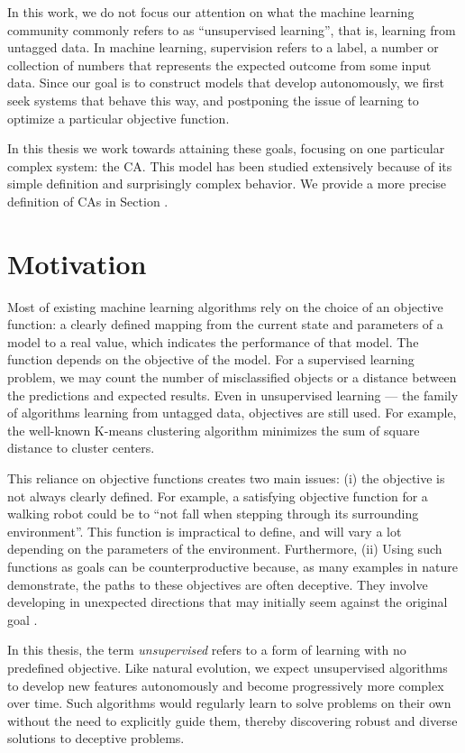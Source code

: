 In this work, we do not focus our attention on what the machine learning
community commonly refers to as ``unsupervised learning'', that is, learning
from untagged data. In machine learning, supervision refers to a label, a number
or collection of numbers that represents the expected outcome from some input
data. Since our goal is to construct models that develop autonomously, we first
seek systems that behave this way, and postponing the issue of learning to
optimize a particular objective function.

In this thesis we work towards attaining these goals, focusing on one particular
complex system: the \acl{CA}. This model has been studied extensively
because of its simple definition and surprisingly complex behavior. We provide a
more precise definition of \aclp{CA} in Section .


\section{Motivation}

Most of existing machine learning algorithms rely on the choice of an objective
function: a clearly defined mapping from the current state and parameters of a
model to a real value, which indicates the performance of that model. The
function depends on the objective of the model. For a supervised learning
problem, we may count the number of misclassified objects or a distance between
the predictions and expected results. Even in unsupervised learning --- the family of
algorithms learning from untagged data, objectives are still used. For
example, the well-known K-means clustering algorithm minimizes the sum of square
distance to cluster centers.

This reliance on objective functions creates two main issues: (i) the objective
is not always clearly defined. For example, a satisfying objective function for
a walking robot could be to ``not fall when stepping through its surrounding
environment''. This function is impractical to define, and will vary a lot
depending on the parameters of the environment. Furthermore, (ii) Using such
functions as goals can be counterproductive because, as many examples in nature
demonstrate, the paths to these objectives are often deceptive. They involve
developing in unexpected directions that may initially seem against the original
goal \parencite{stanleyWhyGreatnessCannot2015}.

In this thesis, the term \emph{unsupervised} refers to a form of learning with
no predefined objective. Like natural evolution, we expect unsupervised
algorithms to develop new features autonomously and become progressively more
complex over time. Such algorithms would regularly learn to solve problems on
their own without the need to explicitly guide them, thereby discovering robust
and diverse solutions to deceptive problems.


